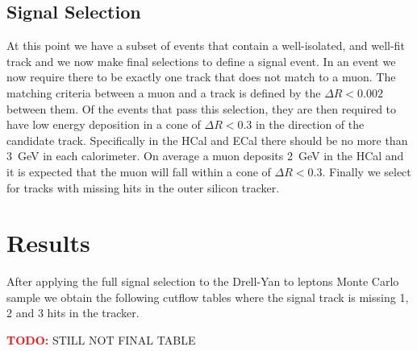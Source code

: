 \documentclass[a4paper,12pt]{article}
\newcommand\makebetter[1]{\textcolor{red}{\textbf{TODO:}} {#1}}
\begin{document}
    \subsection{Signal Selection}

        At this point we have a subset of events that contain a well-isolated,
        and well-fit track and we now make final selections to define a signal
        event.  In an event we now require there to be exactly one track that
        does not match to a muon. The matching criteria between a muon and a
        track is defined by the $\Delta R < 0.002$ between them. Of the events
        that pass this selection, they are then required to have low energy
        deposition in a cone of $\Delta R < 0.3$ in the direction of the
        candidate track. Specifically in the HCal and ECal there should be no
        more than 3~GeV in each calorimeter. On average a muon deposits 2~GeV in
        the HCal and it is expected that the muon will fall within a cone of
        $\Delta R < 0.3$.  Finally we select for tracks with missing hits in the
        outer silicon tracker.

\section{Results}

    After applying the full signal selection to the Drell-Yan to leptons Monte
    Carlo sample we obtain the following cutflow tables where the signal track
    is missing 1, 2 and 3 hits in the tracker.

    \makebetter{STILL NOT FINAL TABLE}
\end{document}
